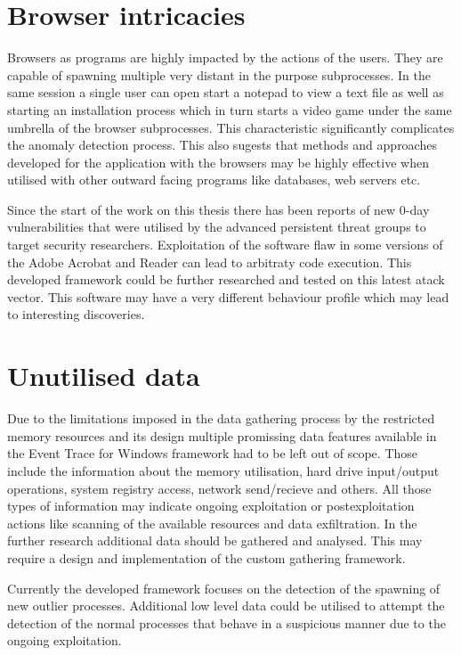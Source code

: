 \documentclass[a4paper,twoside,12pt]{book}
\begin{document}
\section{Browser intricacies}

Browsers as programs are highly impacted by the actions of the users. They are capable of spawning
multiple very distant in the purpose subprocesses. In the same session a single user can open start
a notepad to view a text file as well as starting an installation process which in turn starts a 
video game under the same umbrella of the browser subprocesses. This characteristic significantly
complicates the anomaly detection process. This also sugests that methods and approaches developed
for the application with the browsers may be highly effective when utilised with other outward 
facing programs like databases, web servers etc.

Since the start of the work on this thesis there has been reports of new 0-day vulnerabilities that were
utilised by the advanced persistent threat groups to target security researchers. Exploitation of the
software flaw in some versions of the Adobe Acrobat and Reader can lead to arbitraty code execution\cite{bib:AdobeExploit}.
This developed framework could be further researched and tested on this latest atack vector. This 
software may have a very different behaviour profile which may lead to interesting discoveries.

\section{Unutilised data}

Due to the limitations imposed in the data gathering process by the restricted memory resources and its
design multiple promissing data features available in the Event Trace for Windows framework had to be
left out of scope. Those include the information about the memory utilisation, hard drive input/output 
operations, system registry access, network send/recieve and others. All those types of information
may indicate ongoing exploitation or postexploitation actions like scanning of the available resources
and data exfiltration. In the further research additional 
data should be gathered and analysed. This may require a design and implementation of the custom  
gathering framework.

Currently the developed framework focuses on the detection of the spawning of new outlier processes.
Additional low level data could be utilised to attempt the detection of the normal processes that behave
in a suspicious manner due to the ongoing exploitation.
\end{document}
